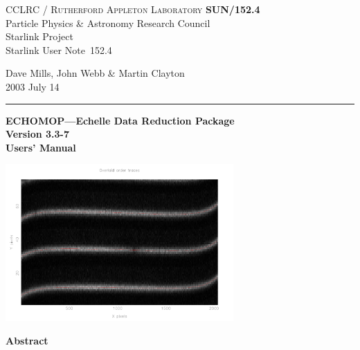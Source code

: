 \documentclass[twoside,11pt]{article}
\newcommand{\stardoccategory}  {Starlink User Note}
\newcommand{\stardocinitials}  {SUN}
\newcommand{\stardocnumber}    {152.4}
\newcommand{\stardocauthors}   {Dave Mills, John Webb \& Martin Clayton}
\newcommand{\stardocdate}      {2003 July 14}
\newcommand{\stardoctitle}     {ECHOMOP---Echelle Data Reduction Package}
\newcommand{\stardocversion}   {Version 3.3-7} %
\newcommand{\stardocmanual}    {Users' Manual}
\newcommand{\stardocname}{\stardocinitials /\stardocnumber}
\newenvironment{latexonly}{}{}
\renewcommand{\_}{\texttt{\symbol{95}}}
\begin{document}
\thispagestyle{empty}

\begin{latexonly}
   CCLRC / \textsc{Rutherford Appleton Laboratory} \hfill \textbf{\stardocname}\\
   {\large Particle Physics \& Astronomy Research Council}\\
   {\large Starlink Project\\}
   {\large \stardoccategory\ \stardocnumber}
   \begin{flushright}
   \stardocauthors\\
   \stardocdate
   \end{flushright}
   \vspace{-4mm}
   \rule{\textwidth}{0.5mm}
   \vspace{5mm}
   \begin{center}
   {\Huge\textbf{\stardoctitle \\ [2.5ex]}}
   {\LARGE\textbf{\stardocversion \\ [4ex]}}
   {\Huge\textbf{\stardocmanual}}
   \end{center}
   \vspace{5mm}

\centering\includegraphics[height=60mm]{sun152_cover}

   \vspace{10mm}
   \begin{center}
      {\Large\textbf{Abstract}}
   \end{center}
\end{latexonly}
\end{document}
